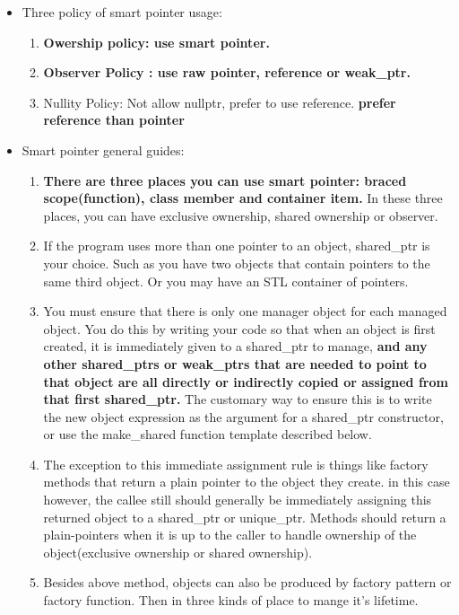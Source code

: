 \documentclass[a4paper,11pt,twoside]{book}
\begin{document}
\begin{itemize}
\item Three policy of smart pointer usage:
\begin{enumerate}
	\item \textbf{Owership policy: use smart pointer.}
	\item \textbf{Observer Policy : use raw pointer, reference or weak\_ptr.}
	\item Nullity Policy: Not allow nullptr, prefer to use reference. \textbf{prefer reference than pointer}
\end{enumerate}

\item Smart pointer general guides:
\begin{enumerate}
\item \textbf{There are three places you can use smart pointer: braced scope(function), class member and container item.} In these three places, you can have exclusive ownership, shared ownership or observer.

\item If the program uses more than one pointer to an object, shared\_ptr is your choice.  Such as you have two objects that contain pointers to the same third object. Or you may have an STL container of pointers.

\item You must ensure that there is only one manager object for each managed object. You do this by writing your code so that when an object is first created, it is immediately given to a shared\_ptr to manage, \textbf{and any other shared\_ptrs or weak\_ptrs that are needed to point to that object are all directly or indirectly copied or assigned from that first shared\_ptr.} The customary way to ensure this is to write the new object expression as the argument for a shared\_ptr constructor, or use the make\_shared function template described below.

\item The exception to this immediate assignment rule is things like factory methods that return a plain pointer to the object they create. in this case however, the callee still should generally be immediately assigning this returned object to a shared\_ptr or unique\_ptr.  Methods should return a plain-pointers when it is up to the caller to handle ownership of the object(exclusive ownership or shared ownership).

\item Besides above method, objects can also be produced by factory pattern or factory function. Then in three kinds of place to mange it's lifetime. 


\end{enumerate}
\end{itemize}
\end{document}
